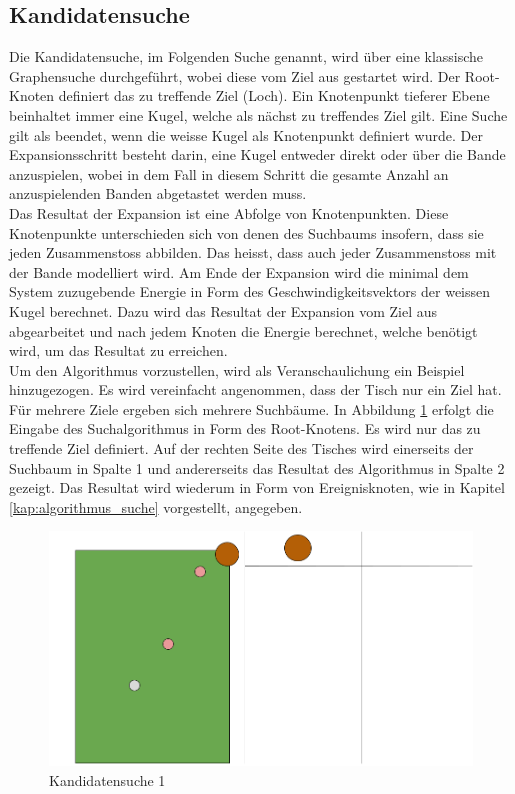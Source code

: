 \subsection{Kandidatensuche}
Die Kandidatensuche, im Folgenden Suche genannt, wird über eine klassische Graphensuche durchgeführt, wobei diese vom Ziel aus gestartet wird.
Der Root-Knoten definiert das zu treffende Ziel (Loch). Ein Knotenpunkt tieferer Ebene beinhaltet immer eine Kugel, welche
als nächst zu treffendes Ziel gilt. Eine Suche gilt als beendet, wenn die weisse Kugel als Knotenpunkt definiert wurde.
Der Expansionsschritt besteht darin, eine Kugel entweder direkt oder über die Bande anzuspielen,
wobei in dem Fall in diesem Schritt die gesamte Anzahl an anzuspielenden Banden abgetastet werden muss.
\\

Das Resultat der Expansion ist eine Abfolge von Knotenpunkten. Diese Knotenpunkte unterschieden sich von denen des
Suchbaums insofern, dass sie jeden Zusammenstoss abbilden. Das heisst, dass auch jeder Zusammenstoss mit der Bande
modelliert wird.
Am Ende der Expansion wird die minimal dem System zuzugebende Energie in Form des Geschwindigkeitsvektors der weissen
Kugel berechnet. Dazu wird das Resultat der Expansion vom Ziel aus abgearbeitet und nach jedem Knoten die Energie
berechnet, welche benötigt wird, um das Resultat zu erreichen.
\\

Um den Algorithmus vorzustellen, wird als Veranschaulichung ein Beispiel hinzugezogen. Es wird vereinfacht angenommen,
dass der Tisch nur ein Ziel hat. Für mehrere Ziele ergeben sich mehrere Suchbäume.
In Abbildung \ref{fig:backwardsearch_1} erfolgt die Eingabe des Suchalgorithmus in Form des Root-Knotens. Es wird nur das zu treffende Ziel
definiert. Auf der rechten Seite des Tisches wird einerseits der Suchbaum in Spalte 1 und andererseits das Resultat
des Algorithmus in Spalte 2 gezeigt. Das Resultat wird wiederum in Form von Ereignisknoten, wie in Kapitel \ref{kap:algorithmus_suche}
vorgestellt, angegeben.

\begin{figure}[h!]
    \begin{center}
        \includegraphics[width=0.5\linewidth]{../common/03_billiard_ai/resources/11_backwardsearch_1.png}
    \end{center}
    \caption{Kandidatensuche 1}
    \label{fig:backwardsearch_1}
\end{figure}

